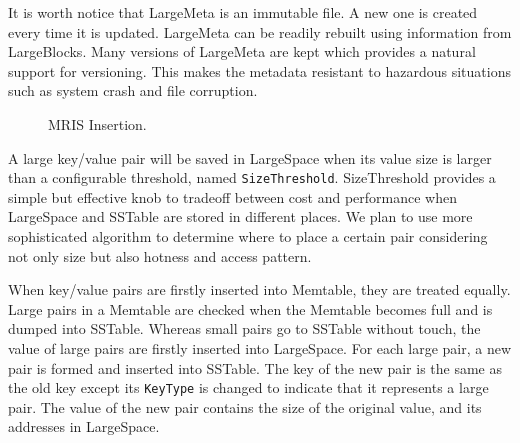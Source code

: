 It is worth notice that LargeMeta is an immutable file. A new one is
created every time it is updated. LargeMeta can be readily rebuilt
using information from LargeBlocks. Many versions of LargeMeta are
kept which provides a natural support for versioning. This makes the
metadata resistant to hazardous situations such as system crash and
file corruption.

\begin{figure}[t]
\begin{centering}
\caption{MRIS Insertion.}
\label{fig:mrisinsert}
\end{centering}
\end{figure}

A large key/value pair will be saved in LargeSpace when its value size
is larger than a configurable threshold, named \texttt{SizeThreshold}.
SizeThreshold provides a simple but effective knob to tradeoff between
cost and performance when LargeSpace and SSTable are stored in
different places. We plan to use more sophisticated algorithm to
determine where to place a certain pair considering not only size but
also hotness and access pattern.

When key/value pairs are firstly inserted into Memtable, they are
treated equally. Large pairs in a Memtable are checked when the
Memtable becomes full and is dumped into SSTable. Whereas small pairs
go to SSTable without touch, the value of large pairs are firstly
inserted into LargeSpace. For each large pair, a new pair is formed
and inserted into SSTable. The key of the new pair is the same as the
old key except its \texttt{KeyType} is changed to indicate that it
represents a large pair.  The value of the new pair contains the size
of the original value, and its addresses in LargeSpace.

